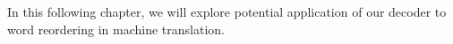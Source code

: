 In this following chapter, we will explore potential application of our decoder
to word reordering in machine translation.


%


